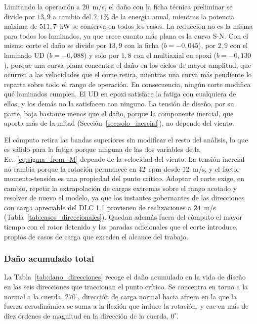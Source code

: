 Limitando la operación a $20$~m/s, el daño con la ficha técnica preliminar se divide por $13{,}9$ a cambio del $2{,}1\%$ de la energía anual, mientras la potencia máxima de $511{,}7$~kW se conserva en todos los casos. La reducción no es la misma para todos los laminados, ya que crece cuanto más plana es la curva S-N. Con el mismo corte el daño se divide por $13{,}9$ con la ficha ($b = -0{,}045$), por $2{,}9$ con el laminado UD ($b = -0{,}088$) y solo por $1{,}8$ con el multiaxial en epoxi ($b = -0{,}130$), porque una curva plana concentra el daño en los ciclos de mayor amplitud, que ocurren a las velocidades que el corte retira, mientras una curva más pendiente lo reparte sobre todo el rango de operación. En consecuencia, ningún corte modifica qué laminados cumplen. El UD en epoxi satisface la fatiga con cualquiera de ellos, y los demás no la satisfacen con ninguno. La tensión de diseño, por su parte, baja bastante menos que el daño, porque la componente inercial, que aporta más de la mitad (Sección~\ref{sec:solo_inercial}), no depende del viento.

El cómputo retira las bandas superiores sin modificar el resto del análisis, lo que es válido para la fatiga porque ninguna de las dos variables de la Ec.~\ref{eq:sigma_from_M} depende de la velocidad del viento. La tensión inercial no cambia porque la rotación permanece en $42$~rpm desde $12$~m/s, y el factor momento-tensión es una propiedad del punto crítico. Adoptar el corte exige, en cambio, repetir la extrapolación de cargas extremas sobre el rango acotado y resolver de nuevo el modelo, ya que los instantes gobernantes de las direcciones con carga apreciable del DLC 1.1 provienen de realizaciones a $24$~m/s (Tabla~\ref{tab:casos_direccionales}). Quedan además fuera del cómputo el mayor tiempo con el rotor detenido y las paradas adicionales que el corte introduce, propios de casos de carga que exceden el alcance del trabajo.

\subsubsection{Daño acumulado total}
\label{sec:dano_total}

La Tabla~\ref{tab:dano_direcciones} recoge el daño acumulado en la vida de diseño en las seis direcciones que traccionan el punto crítico. Se concentra en torno a la normal a la cuerda, $270^\circ$, dirección de carga normal hacia afuera en la que la fuerza aerodinámica se suma a la flexión que induce la rotación, y cae en más de diez órdenes de magnitud en la dirección de la cuerda, $0^\circ$.

